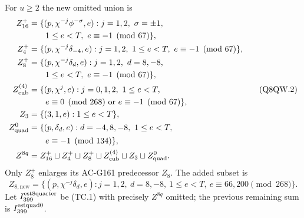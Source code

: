For $u\geq2$ the new omitted union is
\[
 \begin{aligned}
 Z_{16}^+&=\{(p,\chi^{-j}\phi^{-\sigma},e):j=1,2,\ \sigma=\pm1,\\
 &\hspace{2em}1\leq e<T,\ e\equiv-1\pmod{67}\},\\
 Z_4^+&=\{(p,\chi^{-j}\delta_{-4},e):j=1,2,\ 1\leq e<T,
                                      \ e\equiv-1\pmod{67}\},\\
 Z_8^+&=\{(p,\chi^{-j}\delta_d,e):j=1,2,\ d=8,-8,\\
 &\hspace{2em}1\leq e<T,\ e\equiv-1\pmod{67}\},\\
 Z_{\rm cub}^{(4)}&=\{(p,\chi^j,e):j=0,1,2,\ 1\leq e<T,\\
 &\hspace{2em}e\equiv0\pmod{268}\ \text{or}\ e\equiv-1\pmod{67}\},\\
 Z_3&=\{(3,1,e):1\leq e<T\},\\
 Z_{\rm quad}^0&=\{(p,\delta_d,e):d=-4,8,-8,\ 1\leq e<T,\\
 &\hspace{2em}e\equiv-1\pmod{134}\},\\
 Z^{8q}&=Z_{16}^+\sqcup Z_4^+\sqcup Z_8^+
                  \sqcup Z_{\rm cub}^{(4)}\sqcup Z_3\sqcup Z_{\rm quad}^0.
 \end{aligned}
 \tag{Q8QW.2}
\]
Only $Z_8^+$ enlarges its AC-G161 predecessor $Z_8$.
The added subset is
\[
 Z_{8,\mathrm{new}}=
 \{(p,\chi^{-j}\delta_d,e):j=1,2,\ d=8,-8,
              \ 1\leq e<T,\ e\equiv66,200\pmod{268}\}.
 \tag{Q8QW.3}
\]
Let $I_{399}^{\rm est8quarter}$ be (TC.1) with precisely
$Z^{8q}$ omitted; the previous remaining sum is
$I_{399}^{\rm estquad0}$.

